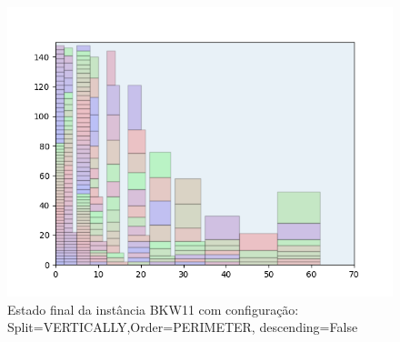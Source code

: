 \begin{figure}[H]
    \centering
    \caption[]{Estado final da instância BKW11 com configuração: Split=VERTICALLY,Order=PERIMETER, descending=False}
    \label{fig:bkw11-vertically-perimeter-false}
    \includegraphics[scale=0.5]{output/figures/bkw/bkw11/vertically/perimeter/false/000}
\end{figure}